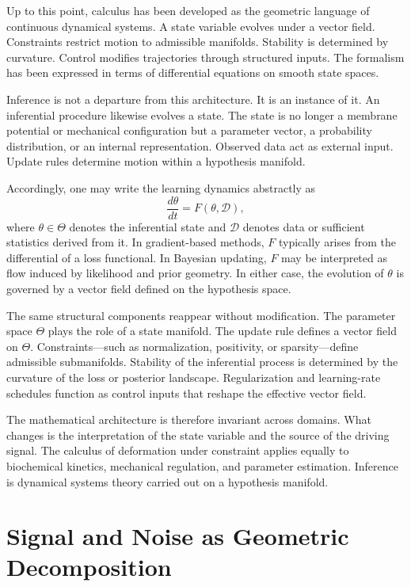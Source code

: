 \documentclass[12pt]{book}
\begin{document}
Up to this point, calculus has been developed as the geometric language of
continuous dynamical systems. A state variable evolves under a vector field.
Constraints restrict motion to admissible manifolds. Stability is determined
by curvature. Control modifies trajectories through structured inputs. The
formalism has been expressed in terms of differential equations on smooth
state spaces.

Inference is not a departure from this architecture. It is an instance of it.
An inferential procedure likewise evolves a state. The state is no longer a
membrane potential or mechanical configuration but a parameter vector, a
probability distribution, or an internal representation. Observed data act as
external input. Update rules determine motion within a hypothesis manifold.

Accordingly, one may write the learning dynamics abstractly as
\[
\frac{d\theta}{dt}
=
F(\theta, \mathcal{D}),
\]
where $\theta \in \Theta$ denotes the inferential state and $\mathcal{D}$
denotes data or sufficient statistics derived from it. In gradient-based
methods, $F$ typically arises from the differential of a loss functional.
In Bayesian updating, $F$ may be interpreted as flow induced by likelihood
and prior geometry. In either case, the evolution of $\theta$ is governed by
a vector field defined on the hypothesis space.

The same structural components reappear without modification. The parameter
space $\Theta$ plays the role of a state manifold. The update rule defines a
vector field on $\Theta$. Constraints---such as normalization, positivity,
or sparsity---define admissible submanifolds. Stability of the inferential
process is determined by the curvature of the loss or posterior landscape.
Regularization and learning-rate schedules function as control inputs that
reshape the effective vector field.

The mathematical architecture is therefore invariant across domains. What
changes is the interpretation of the state variable and the source of the
driving signal. The calculus of deformation under constraint applies equally
to biochemical kinetics, mechanical regulation, and parameter estimation.
Inference is dynamical systems theory carried out on a hypothesis manifold.

\section{Signal and Noise as Geometric Decomposition}
\end{document}

